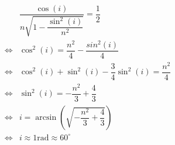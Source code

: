 \documentclass[12pt, letterpaper]{article}
\begin{document}
\begin{equation}
    \begin{split}
     & \dfrac{\cos(i)}{n\sqrt{1-\dfrac{\sin^2(i)}{n^2}}} = \dfrac12 \\
     \iff & \cos^2(i) = \dfrac{n^2}4 -\dfrac{sin^2(i)}4 \\
     \iff & \cos^2(i) + \sin^2(i) - \dfrac34\sin^2(i) = \dfrac{n^2}4 \\
     \iff & \sin^2(i) = -\dfrac{n^2}3 + \dfrac43 \\
     \iff & i = \arcsin\left(\sqrt{-\dfrac{n^2}3 + \dfrac43}\right) \\
     \iff & i \approx  1 \text{rad} \approx 60^\circ \\
    \end{split}
\end{equation}
\end{document}

